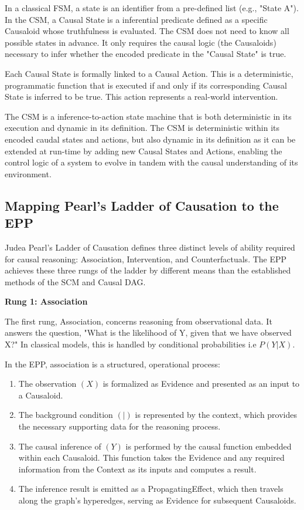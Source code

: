In a classical FSM, a state is an identifier from a pre-defined list (e.g., "State A").
In the CSM, a Causal State is a inferential predicate defined as a specific Causaloid whose truthfulness is evaluated. The CSM does not need to know all possible states in advance. It only requires the causal logic (the Causaloids) necessary to infer whether the encoded predicate in the "Causal State" is true. 

Each Causal State is formally linked to a Causal Action. This is a deterministic, programmatic function that is executed if and only if its corresponding Causal State is inferred to be true. This action represents a real-world intervention.

The CSM is a inference-to-action state machine that is both deterministic in its execution and dynamic in its definition. The CSM is deterministic within its encoded caudal states and actions, but also dynamic in its definition as it can be extended at run-time by adding new Causal States and Actions, enabling the control logic of a system to evolve in tandem with the causal understanding of its environment. 

%
%
\subsection{Mapping Pearl's Ladder of Causation to the EPP}
\label{sec:epp_ladder_causation}

Judea Pearl's Ladder of Causation\cite{pearl2000causality} defines three distinct levels of ability required for causal reasoning: Association, Intervention, and Counterfactuals. The EPP achieves these three rungs of the ladder by different means than the established methods of the SCM and Causal DAG.  

\textbf{Rung 1: Association}

The first rung, Association, concerns reasoning from observational data. 
It answers the question, "What is the likelihood of Y, given that we have observed X?" In classical models, this is handled by conditional probabilities i.e $P(Y|X)$.

In the EPP, association is a structured, operational process:

\begin{enumerate}
	\item The observation $(X)$ is formalized as Evidence and presented as an input to a Causaloid.
	\item The background condition $(|)$ is represented by the context, which provides the necessary supporting data for the reasoning process.
	\item The causal inference of $(Y)$ is performed by the causal function embedded within each Causaloid. This function takes the Evidence and any required information from the Context as its inputs and computes a result.
	\item The inference result is emitted as a PropagatingEffect, which then travels along the graph's hyperedges, serving as Evidence for subsequent Causaloids.
\end{enumerate}

